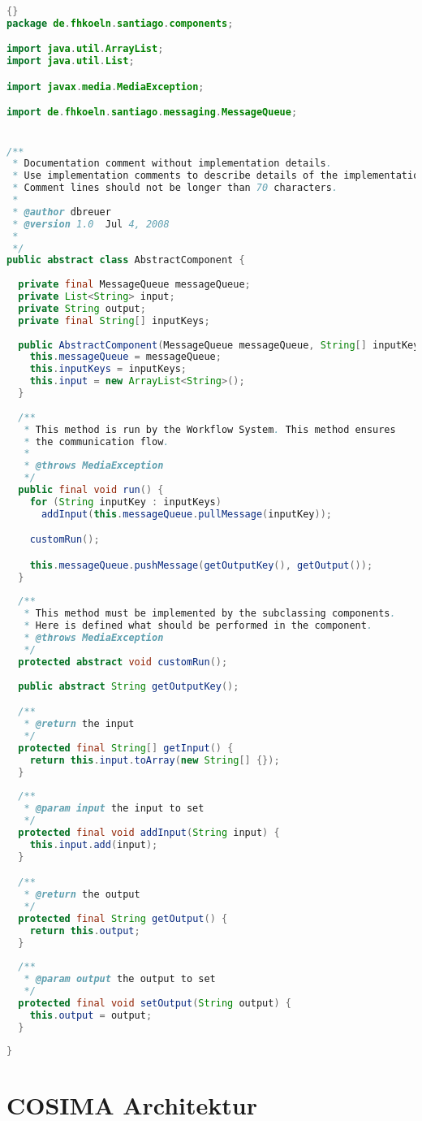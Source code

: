 \begin{lstlisting}[caption=\texttt{AbstractComponent} Klasse,label=lst:abstract_component_klasse,language=Java]{}
package de.fhkoeln.santiago.components;

import java.util.ArrayList;
import java.util.List;

import javax.media.MediaException;

import de.fhkoeln.santiago.messaging.MessageQueue;


/**
 * Documentation comment without implementation details. 
 * Use implementation comments to describe details of the implementation.
 * Comment lines should not be longer than 70 characters.
 *
 * @author dbreuer
 * @version 1.0  Jul 4, 2008
 *
 */
public abstract class AbstractComponent {
  
  private final MessageQueue messageQueue;
  private List<String> input;
  private String output;
  private final String[] inputKeys;
  
  public AbstractComponent(MessageQueue messageQueue, String[] inputKeys) {
    this.messageQueue = messageQueue;
    this.inputKeys = inputKeys;
    this.input = new ArrayList<String>();
  }
  
  /**
   * This method is run by the Workflow System. This method ensures
   * the communication flow.
   * 
   * @throws MediaException
   */
  public final void run() {
    for (String inputKey : inputKeys)
      addInput(this.messageQueue.pullMessage(inputKey));

    customRun();

    this.messageQueue.pushMessage(getOutputKey(), getOutput());
  }
  
  /**
   * This method must be implemented by the subclassing components.
   * Here is defined what should be performed in the component.
   * @throws MediaException 
   */
  protected abstract void customRun();
  
  public abstract String getOutputKey();

  /**
   * @return the input
   */
  protected final String[] getInput() {
    return this.input.toArray(new String[] {});
  }
  
  /**
   * @param input the input to set
   */
  protected final void addInput(String input) {
    this.input.add(input);
  }

  /**
   * @return the output
   */
  protected final String getOutput() {
    return this.output;
  }
  
  /**
   * @param output the output to set
   */
  protected final void setOutput(String output) {
    this.output = output;
  }
  
}
\end{lstlisting}


\section{COSIMA Architektur} %
\label{sec:cosima_architektur}


